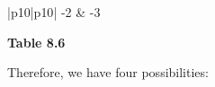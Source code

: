 {\begin{center}
\begin{xtabular*}{\mytablewidth}[t]{|p{10\mystarwidth}|p{10\mystarwidth}|}
        -2 &
        -3%
     \tabularnewline{}
    \end{xtabular*}
      \end{center}
    \begin{center}{\small\bfseries Table 8.6}\end{center}
        }%
    \par
      \label{m39394*id276096}Therefore, we have four possibilities:\par 
    \setlength\mytablespace{8\tabcolsep}
    \addtolength\mytablespace{5\arrayrulewidth}
    \setlength\mytablewidth{\linewidth}
    \setlength\mytableroom{\mytablewidth}
    \addtolength\mytableroom{-\mytablespace}
    \setlength\myfixedwidth{0pt}
    \setlength\mystarwidth{\mytableroom}
        \addtolength\mystarwidth{-\myfixedwidth}
        \divide{}
